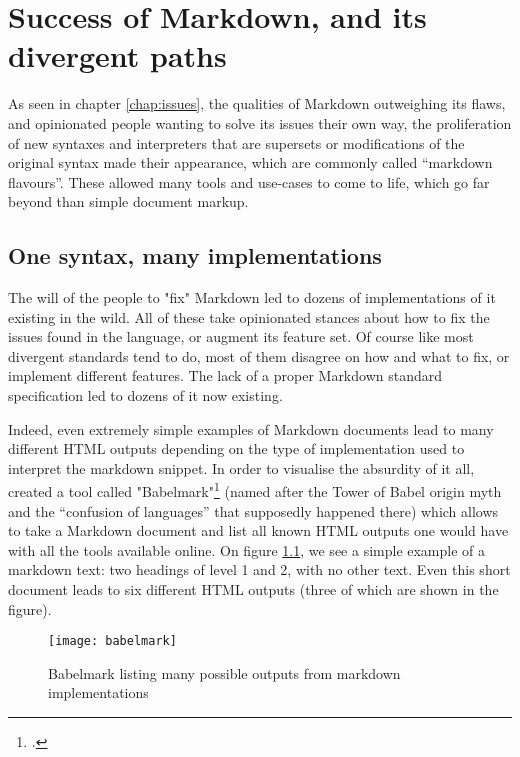 \chapter{Success of Markdown, and its divergent paths}
\label{chap:proliferation}

\vspace{1cm}

As seen in chapter \ref{chap:issues}, the qualities of Markdown outweighing its flaws, and opinionated people wanting to solve its issues
their own way, the proliferation of new syntaxes and interpreters that are supersets or modifications of the original syntax made their appearance,
which are commonly called ``markdown flavours''. These allowed many tools and use-cases to come to life, which go far beyond than simple document
markup.

\section{One syntax, many implementations}

The will of the people to "fix" Markdown led to dozens of implementations of it existing in the wild. All of these take opinionated stances
about how to fix the issues found in the language, or augment its feature set. Of course like most divergent standards tend to do, most of them
disagree on how and what to fix, or implement different features. The lack of a proper Markdown standard specification led to dozens of
it now existing.\newline

Indeed, even extremely simple examples of Markdown documents lead to many different HTML outputs depending on the type of implementation used
to interpret the markdown snippet. In order to visualise the absurdity of it all, \citeauthor{babelmark} created a tool called
"Babelmark"\footcite{babelmark} (named after the Tower of Babel origin myth and the ``confusion of languages'' that supposedly happened there)
which allows to take a Markdown document and list all known HTML outputs one would have with all the tools available online.
On figure \ref{fig:babelmark}, we see a simple example of a markdown text: two headings of level 1 and 2, with no other text.
Even this short document leads to six different HTML outputs (three of which are shown in the figure).

\begin{figure}[H]
\centering
\texttt{[image: babelmark]}
\caption{Babelmark listing many possible outputs from markdown implementations}
\label{fig:babelmark}
\end{figure}

